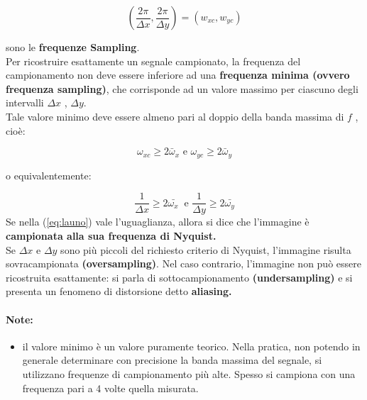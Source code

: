 $$
    (\frac{2\pi}{\Delta x}, \frac{2 \pi}{\Delta y}) = (w_{xc}, w_{yc})
$$

sono le \textbf{frequenze Sampling}.\\

Per ricostruire esattamente un segnale campionato, la frequenza del
campionamento non deve essere inferiore ad una \textbf{frequenza minima (ovvero
    frequenza sampling)}, che corrisponde ad un valore massimo per ciascuno degli
intervalli $\Delta x$ , $\Delta y$.\\

Tale valore minimo deve essere almeno pari al doppio della banda massima di $f$
, cioè:

\begin{equation}\label{eq:launo}
    \omega_{xc} \geq 2 \bar{\omega}_x \text{ e } \omega_{yc} \geq 2 \bar{\omega}_y
\end{equation}

o equivalentemente:

$$
    \frac{1}{\Delta x} \ge 2 \bar{\omega_x} \ \text{ e } \frac{1}{\Delta y} \ge 2 \bar{\omega_y}
$$
Se nella (\ref{eq:launo}) vale l'uguaglianza, allora si dice che l'immagine è
\textbf{campionata alla sua frequenza di Nyquist.}\\

Se $\Delta x$ e $\Delta y$ sono più piccoli del richiesto criterio di Nyquist,
l'immagine risulta sovracampionata \textbf{(oversampling)}. Nel caso contrario,
l'immagine non può essere ricostruita esattamente: si parla di
sottocampionamento \textbf{(undersampling)} e si presenta un fenomeno di
distorsione detto \textbf{aliasing.}

\paragraph{Note:}
\begin{itemize}
    \item il valore minimo è un valore puramente teorico. Nella pratica, non
          potendo in generale determinare con precisione la banda massima del
          segnale, si utilizzano frequenze di campionamento più alte. Spesso si
          campiona con una frequenza pari a 4 volte quella misurata.
\end{itemize}

